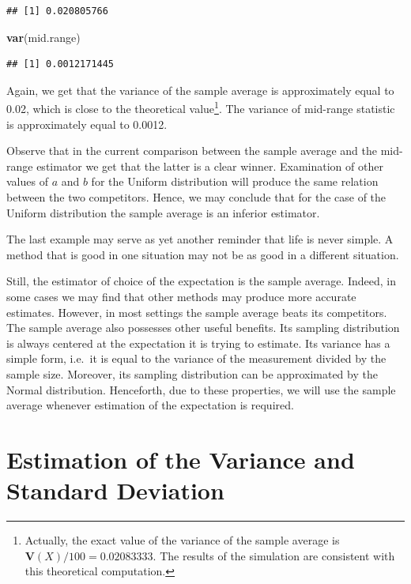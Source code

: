 \documentclass[]{krantz}
\makeatletter
\newenvironment{Shaded}{\begin{snugshade}}{\end{snugshade}}
\newcommand{\KeywordTok}[1]{\textcolor[rgb]{0.13,0.29,0.53}{\textbf{#1}}}
\newcommand{\NormalTok}[1]{#1}
\newcommand{\Var}{\mathbf{V}}
\newenvironment{kframe}{%
\medskip{}
\setlength{\fboxsep}{.8em}
 \def\at@end@of@kframe{}%
 \ifinner\ifhmode%
  \def\at@end@of@kframe{\end{minipage}}%
  \begin{minipage}{\columnwidth}%
 \fi\fi%
 \def\FrameCommand##1{\hskip\@totalleftmargin \hskip-\fboxsep
 \colorbox{shadecolor}{##1}\hskip-\fboxsep
     \hskip-\linewidth \hskip-\@totalleftmargin \hskip\columnwidth}%
 \MakeFramed {\advance\hsize-\width
   \@totalleftmargin\z@ \linewidth\hsize
   \@setminipage}}%
 {\par\unskip\endMakeFramed%
 \at@end@of@kframe}
\renewenvironment{Shaded}{\begin{kframe}}{\end{kframe}}
\theoremstyle{definition}
\theoremstyle{definition}
\theoremstyle{definition}
\theoremstyle{remark}
\makeatother
\begin{document}
\begin{verbatim}
## [1] 0.020805766
\end{verbatim}

\begin{Shaded}
\begin{Highlighting}[]
\KeywordTok{var}\NormalTok{(mid.range)}
\end{Highlighting}
\end{Shaded}

\begin{verbatim}
## [1] 0.0012171445
\end{verbatim}

Again, we get that the variance of the sample average is approximately
equal to 0.02, which is close to the theoretical value\footnote{Actually, the exact value of the variance of the sample average is
  \(\Var(X)/100 = 0.02083333\). The results of the simulation are
  consistent with this theoretical computation.}. The variance
of mid-range statistic is approximately equal to 0.0012.

Observe that in the current comparison between the sample average and
the mid-range estimator we get that the latter is a clear winner.
Examination of other values of \(a\) and \(b\) for the Uniform distribution
will produce the same relation between the two competitors. Hence, we
may conclude that for the case of the Uniform distribution the sample
average is an inferior estimator.

The last example may serve as yet another reminder that life is never
simple. A method that is good in one situation may not be as good in a
different situation.

Still, the estimator of choice of the expectation is the sample average.
Indeed, in some cases we may find that other methods may produce more
accurate estimates. However, in most settings the sample average beats
its competitors. The sample average also possesses other useful
benefits. Its sampling distribution is always centered at the
expectation it is trying to estimate. Its variance has a simple form,
i.e.~it is equal to the variance of the measurement divided by the
sample size. Moreover, its sampling distribution can be approximated by
the Normal distribution. Henceforth, due to these properties, we will
use the sample average whenever estimation of the expectation is
required.

\hypertarget{estimation-of-the-variance-and-standard-deviation}{%
\section{Estimation of the Variance and Standard Deviation}\label{estimation-of-the-variance-and-standard-deviation}}
\end{document}

